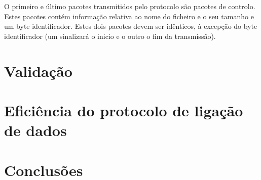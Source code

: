 \documentclass[11pt]{report}
\begin{document}
O primeiro e último pacotes transmitidos pelo protocolo são pacotes de controlo.
Estes pacotes contém informação relativa ao nome do ficheiro e o seu tamanho e
um byte identificador. Estes dois pacotes devem ser idênticos, à excepção do byte
identificador (um sinalizará o inicio e o outro o fim da transmissão).

\chapter{Validação}

\chapter{Eficiência do protocolo de ligação de dados}

\chapter{Conclusões}
\end{document}
